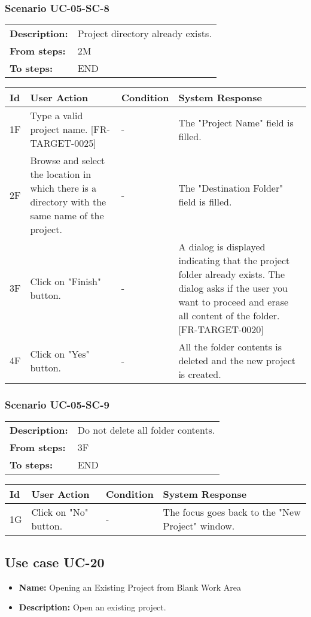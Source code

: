 \documentclass[a4paper,11pt]{article}
\newcommand{\bl}{\\ \hline}
\begin{document}
\subsubsection*{Scenario UC-05-SC-8}
\begin{tabular}{p{1in}p{4in}}
{\bf Description:} & Project directory already exists. \\
{\bf From steps:} & 2M \\
{\bf To steps:} & END \\
\end{tabular}
 
\begin{tabular}{|p{0.8in}|p{1.6in}|p{1.6in}|p{1.6in}|}
\hline
Id & User Action & Condition & System Response  \bl 
1F & Type a valid project name. [FR-TARGET-0025] & - & The "Project Name" field is filled. \bl 
2F & Browse and select the location in which there is a directory with the same name of the project. & - & The "Destination Folder" field is filled. \bl 
3F & Click on "Finish" button. & - & A dialog is displayed indicating that the project folder already exists. The dialog asks if the user you want to proceed and erase all content of the folder. [FR-TARGET-0020] \bl 
4F & Click on "Yes" button. & - & All the folder contents is deleted and the new project is created. \bl 
\end{tabular}
\subsubsection*{Scenario UC-05-SC-9}
\begin{tabular}{p{1in}p{4in}}
{\bf Description:} & Do not delete all folder contents. \\
{\bf From steps:} & 3F \\
{\bf To steps:} & END \\
\end{tabular}
 
\begin{tabular}{|p{0.8in}|p{1.6in}|p{1.6in}|p{1.6in}|}
\hline
Id & User Action & Condition & System Response  \bl 
1G & Click on "No" button. & - & The focus goes back to the "New Project" window. \bl 
\end{tabular}
\subsection*{Use case UC-20}
\begin{itemize}
\item {\bf Name: }Opening an Existing Project from Blank Work Area
\item {\bf Description: }Open an existing project.
\end{itemize}
\end{document}

